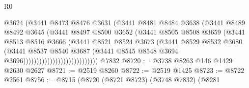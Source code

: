 \begin{lexlean}{R0}
\begin{coremodule}
                                        @3624
                                        (@3441
                                          @8473
                                          @8476
                                          @3631
                                          (@3441
                                            @8481
                                            @8484
                                            @3638
                                            (@3441
                                              @8489
                                              @8492
                                              @3645
                                              (@3441
                                                @8497
                                                @8500
                                                @3652
                                                (@3441
                                                  @8505
                                                  @8508
                                                  @3659
                                                  (@3441
                                                    @8513
                                                    @8516
                                                    @3666
                                                    (@3441
                                                      @8521
                                                      @8524
                                                      @3673
                                                      (@3441
                                                        @8529
                                                        @8532
                                                        @3680
                                                        (@3441
                                                          @8537
                                                          @8540
                                                          @3687
                                                          (@3441
                                                            @8545
                                                            @8548
                                                            @3694
                                                            @3696))))))))))))))))))))))))))))
    @7832
@8720 := @3738 @8263 @146 @1429 @2630 @2627
@8721 := @2519 @8260
@8722 := @2519 @1425
@8723 := @8722 @2561
@8756 := @8715
    (@8720
      (@8721 @8723)
      (@3748 @7832)
      (@8281

\end{coremodule}
\end{lexlean}
